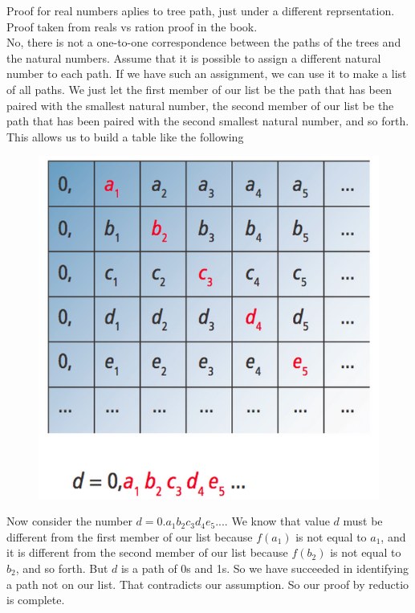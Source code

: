 \documentclass{article}
\begin{document}
\begin{enumerate}
	Proof for real numbers aplies to tree path, just under a different reprsentation. Proof taken from reals vs ration proof in the book.\\
	No, there is not a one-to-one correspondence between the paths of the trees and the natural numbers. Assume that it is possible to assign a different natural number to each path. If we have such an assignment, we can use it to make a list of all paths. We just let the first member of our list be the path that has been paired with the smallest natural number, the second member of our list be the path that has been paired with the second smallest natural number, and so forth. This allows us to build a table like the following\\

\begin{figure}[!htb]
	\minipage{\textwidth}
		\includegraphics[width=\linewidth/3]{images/reals.png}
	\endminipage\hfill
\end{figure}

Now consider the number $d=0.a_1b_2c_3d_4e_5...$. We know that value $d$ must be different from the first member of our list because $f(a_1)$ is not equal to $a_1$, and it is different from the second member of our list because $f(b_2)$ is not equal to $b_2$, and so forth. But $d$ is a path of 0s and 1s. So we have succeeded in identifying a path not on our list. That contradicts our assumption. So our proof by reductio is complete.\\

\end{enumerate}
\end{document}
